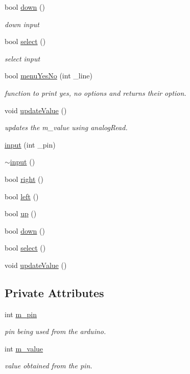 \begin{DoxyCompactItemize}
bool \hyperlink{classinput_a615c57690844ecd80880e57badb93bba}{down} ()
\begin{DoxyCompactList}\small\item\em down input \end{DoxyCompactList}\item 
bool \hyperlink{classinput_a901711b57f1246f7942072cb115275fd}{select} ()
\begin{DoxyCompactList}\small\item\em select input \end{DoxyCompactList}\item 
bool \hyperlink{classinput_a3ed43022f4d0dc7d90112be63e63f0dd}{menu\-Yes\-No} (int \-\_\-line)
\begin{DoxyCompactList}\small\item\em function to print yes, no options and returns their option. \end{DoxyCompactList}\item 
void \hyperlink{classinput_a9c104f58745e36eb6b3d8aa23c7b332c}{update\-Value} ()
\begin{DoxyCompactList}\small\item\em updates the m\-\_\-value using analog\-Read. \end{DoxyCompactList}\item 
\hyperlink{classinput_a81bd56098a20734b9234ff8420bf2b15}{input} (int \-\_\-pin)
\item 
\hyperlink{classinput_a42c3af557d6d247deb8648550c490840}{$\sim$input} ()
\item 
bool \hyperlink{classinput_a5a3033dd853b1b7647e87b1a2ce0935f}{right} ()
\item 
bool \hyperlink{classinput_a51c9f2745deb20753cdf948e9e7f6419}{left} ()
\item 
bool \hyperlink{classinput_a62b8ecc2d123601baba9f780736cb9f9}{up} ()
\item 
bool \hyperlink{classinput_a615c57690844ecd80880e57badb93bba}{down} ()
\item 
bool \hyperlink{classinput_a901711b57f1246f7942072cb115275fd}{select} ()
\item 
void \hyperlink{classinput_a9c104f58745e36eb6b3d8aa23c7b332c}{update\-Value} ()
\end{DoxyCompactItemize}
\subsection*{Private Attributes}
\begin{DoxyCompactItemize}
\item 
int \hyperlink{classinput_a33d519add25b71fe6c08ab5d399d6a44}{m\-\_\-pin}
\begin{DoxyCompactList}\small\item\em pin being used from the arduino. \end{DoxyCompactList}\item 
int \hyperlink{classinput_acb760feb1d09a108e34488537725f1e2}{m\-\_\-value}
\begin{DoxyCompactList}\small\item\em value obtained from the pin. \end{DoxyCompactList}\end{DoxyCompactItemize}


